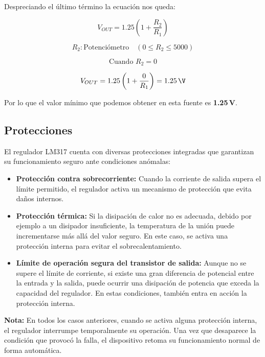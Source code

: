 \documentclass[chaptersright]{informeutn}
\begin{document}
        Despreciando el último término la ecuación nos queda:
        
        \[
        V_{OUT} = 1.25 \left(1 + \frac{R_2}{R_1}\right)
        \]
        
        \[
        R_2 : \text{Potenciómetro} \quad (0 \leq R_2 \leq 5000)
        \]
        
        \[
        \text{Cuando } R_2 = 0
        \]
        
        \[
        V_{OUT} = 1.25 \left(1 + \frac{0}{R_1}\right) = 1.25\,\V
        \]
        
        Por lo que el valor mínimo que podemos obtener en esta fuente es \textbf{1.25\,V}.
    
        \subsection{Protecciones}
          El regulador LM317 cuenta con diversas protecciones integradas que garantizan su funcionamiento seguro ante
          condiciones anómalas:
          
          \begin{itemize}
              \item \textbf{Protección contra sobrecorriente:} Cuando la corriente de salida supera el límite permitido, 
                el regulador activa un mecanismo de protección que evita daños internos.
          
              \item \textbf{Protección térmica:} Si la disipación de calor no es adecuada, debido por ejemplo a un 
                disipador insuficiente, la temperatura de la unión puede incrementarse más allá del valor seguro. En este caso, se activa una protección interna para evitar el sobrecalentamiento.
          
              \item \textbf{Límite de operación segura del transistor de salida:} Aunque no se supere el límite de 
                corriente, si existe una gran diferencia de potencial entre la entrada y la salida, puede ocurrir una 
                disipación de potencia que exceda la capacidad del regulador. En estas condiciones, también entra en 
                acción la protección interna.
          \end{itemize}
          
          \textbf{Nota:} En todos los casos anteriores, cuando se activa alguna protección interna, el regulador 
            interrumpe temporalmente su operación. Una vez que desaparece la condición que provocó la falla, el 
            dispositivo retoma su funcionamiento normal de forma automática.
\end{document}
